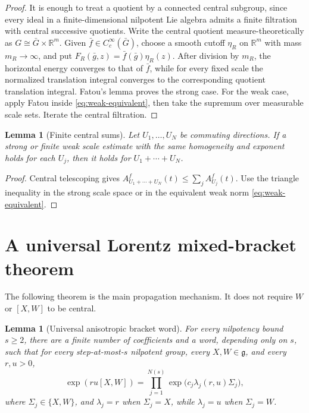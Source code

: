 \documentclass[11pt]{article}
\newtheorem{lemma}[theorem]{Lemma}
\theoremstyle{definition}
\theoremstyle{remark}
\newcommand{\R}{\mathbb R}
\newcommand{\g}{\mathfrak g}
\newcommand{\A}[2]{A_{#1}^{#2}}
\begin{document}
\begin{proof}
It is enough to treat a quotient by a connected central subgroup, since every ideal in a
finite-dimensional nilpotent Lie algebra admits a finite filtration with central successive
quotients.  Write the central quotient measure-theoretically as
\(G\cong\bar G\times\R^m\).  Given \(\bar f\in C_c^\infty(\bar G)\), choose a smooth
cutoff \(\eta_R\) on \(\R^m\) with mass \(m_R\to\infty\), and put
\(F_R(\bar g,z)=\bar f(\bar g)\eta_R(z)\).  After division by \(m_R\), the horizontal
energy converges to that of \(\bar f\), while for every fixed scale the normalized
translation integral converges to the corresponding quotient translation integral.
Fatou's lemma proves the strong case.  For the weak case, apply Fatou inside
\eqref{eq:weak-equivalent}, then take the supremum over measurable scale sets.  Iterate
the central filtration.
\end{proof}

\begin{lemma}[Finite central sums]\label{lem:central-sum}
Let \(U_1,\ldots,U_N\) be commuting directions.  If a strong or finite weak scale
estimate with the same homogeneity and exponent holds for each \(U_j\), then it holds for
\(U_1+\cdots+U_N\).
\end{lemma}

\begin{proof}
Central telescoping gives
\(\A{U_1+\cdots+U_N}{f}(t)\le\sum_j\A{U_j}{f}(t)\).  Use the triangle inequality in the
strong scale space or in the equivalent weak norm \eqref{eq:weak-equivalent}.
\end{proof}

\section{A universal Lorentz mixed-bracket theorem}\label{sec:mixed}

The following theorem is the main propagation mechanism.  It does not require \(W\) or
\([X,W]\) to be central.

\begin{lemma}[Universal anisotropic bracket word]\label{lem:word}
For every nilpotency bound \(s\ge2\), there are a finite number of coefficients and a word,
depending only on \(s\), such that for every step-at-most-\(s\) nilpotent group, every
\(X,W\in\g\), and every \(r,u>0\),
\begin{equation}\label{eq:word}
 \exp(ru[X,W])=
 \prod_{j=1}^{N(s)}\exp\bigl(c_j\lambda_j(r,u)\Sigma_j\bigr),
\end{equation}
where \(\Sigma_j\in\{X,W\}\), and \(\lambda_j=r\) when \(\Sigma_j=X\), while
\(\lambda_j=u\) when \(\Sigma_j=W\).
\end{lemma}
\end{document}
